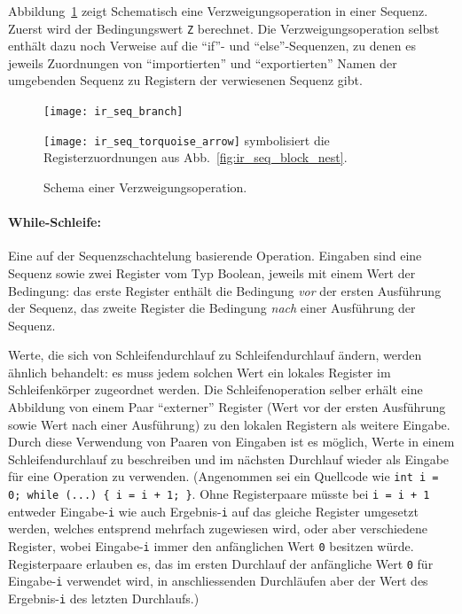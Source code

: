 \documentclass[twoside,a4paper,fleqn,12pt]{article}
\begin{document}

Abbildung~\ref{fig:ir_seq_branch} zeigt Schematisch eine Verzweigungsoperation in einer Sequenz.
Zuerst wird der Bedingungswert \texttt{Z} berechnet. Die Verzweigungsoperation selbst enthält dazu noch
Verweise auf die ``if''- und ``else''-Sequenzen, zu denen es jeweils Zuordnungen von "`importierten"' und "`exportierten"' 
Namen der umgebenden Sequenz zu Registern der verwiesenen Sequenz gibt.

\begin{figure}[h]
   \centering
  \texttt{[image: ir\_seq\_branch]}
  \caption{Schema einer Verzweigungsoperation.}
  \small\texttt{[image: ir\_seq\_torquoise\_arrow]} symbolisiert die Registerzuordnungen aus Abb.~\ref{fig:ir_seq_block_nest}.
  \label{fig:ir_seq_branch}
\end{figure}

\paragraph{While-Schleife:} Eine auf der Sequenzschachtelung basierende Operation. Eingaben sind eine Sequenz sowie zwei Register vom
Typ Boolean, jeweils mit einem Wert der Bedingung: das erste Register enthält die Bedingung \emph{vor} der ersten Ausführung der Sequenz,
das zweite Register die Bedingung \emph{nach} einer Ausführung der Sequenz.

Werte, die sich von Schleifendurchlauf zu Schleifendurchlauf ändern, werden ähnlich behandelt: es muss jedem solchen Wert ein lokales
Register im Schleifenkörper zugeordnet werden. Die Schleifenoperation selber erhält eine Abbildung von einem Paar "`externer"' Register
(Wert vor der ersten Ausführung sowie Wert nach einer Ausführung) zu den lokalen Registern als weitere Eingabe.
Durch diese Verwendung von Paaren von Eingaben ist es möglich, Werte in einem Schleifendurchlauf zu beschreiben
und im nächsten Durchlauf wieder als Eingabe für eine Operation zu verwenden. (Angenommen sei ein Quellcode wie 
\texttt{int i = 0; while (...) \{ i = i + 1; \}}. Ohne Registerpaare müsste bei \texttt{i = i + 1} entweder Eingabe-\texttt{i}
wie auch Ergebnis-\texttt{i} auf das gleiche Register umgesetzt werden, welches entsprend mehrfach zugewiesen wird, oder aber verschiedene Register, wobei
Eingabe-\texttt{i} immer den anfänglichen Wert \texttt{0} besitzen würde. Registerpaare erlauben es, das im ersten Durchlauf
der anfängliche Wert \texttt{0} für Eingabe-\texttt{i} verwendet wird, in anschliessenden Durchläufen aber der Wert des Ergebnis-\texttt{i}
des letzten Durchlaufs.)
\end{document}

